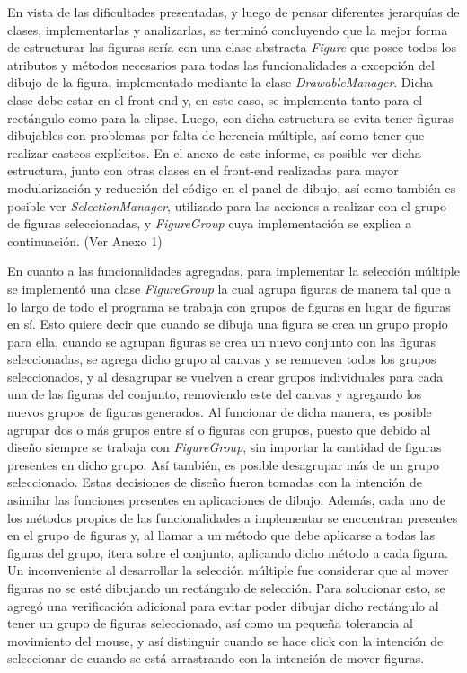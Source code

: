 \documentclass[12pt]{article}
\begin{document}
En vista de las dificultades presentadas, y luego de pensar diferentes jerarquías de clases, implementarlas y analizarlas, se terminó concluyendo que la mejor forma de estructurar las figuras sería con una clase abstracta \textit{Figure} que posee todos los atributos y métodos necesarios para todas las funcionalidades a excepción del dibujo de la figura, implementado mediante la clase \textit{DrawableManager}. Dicha clase debe estar en el front-end y, en este caso, se implementa tanto para el rectángulo como para la elipse. Luego, con dicha estructura se evita tener figuras dibujables con problemas por falta de herencia múltiple, así como tener que realizar casteos explícitos. En el anexo de este informe, es posible ver dicha estructura, junto con otras clases en el front-end realizadas para mayor modularización y reducción del código en el panel de dibujo, así como también es posible ver \textit{SelectionManager}, utilizado para las acciones a realizar con el grupo de figuras seleccionadas, y \textit{FigureGroup} cuya implementación se explica a continuación. (Ver Anexo 1)

En cuanto a las funcionalidades agregadas, para implementar la selección múltiple se implementó una clase \textit{FigureGroup} la cual agrupa figuras de manera tal que a lo largo de todo el programa se trabaja con grupos de figuras en lugar de figuras en sí. Esto quiere decir que cuando se dibuja una figura se crea un grupo propio para ella, cuando se agrupan figuras se crea un nuevo conjunto con las figuras seleccionadas, se agrega dicho grupo al canvas y se remueven todos los grupos seleccionados, y al desagrupar se vuelven a crear grupos individuales para cada una de las figuras del conjunto, removiendo este del canvas y agregando los nuevos grupos de figuras generados. Al funcionar de dicha manera, es posible agrupar dos o más grupos entre sí o figuras con grupos, puesto que debido al diseño siempre se trabaja con \textit{FigureGroup}, sin importar la cantidad de figuras presentes en dicho grupo. Así también, es posible desagrupar más de un grupo seleccionado. Estas decisiones de diseño fueron tomadas con la intención de asimilar las funciones presentes en aplicaciones de dibujo. Además, cada uno de los métodos propios de las funcionalidades a implementar se encuentran presentes en el grupo de figuras y, al llamar a un método que debe aplicarse a todas las figuras del grupo, itera sobre el conjunto, aplicando dicho método a cada figura. Un inconveniente al desarrollar la selección múltiple fue considerar que al mover figuras no se esté dibujando un rectángulo de selección. Para solucionar esto, se agregó una verificación adicional para evitar poder dibujar dicho rectángulo al tener un grupo de figuras seleccionado, así como un pequeña tolerancia al movimiento del mouse, y así distinguir cuando se hace click con la intención de seleccionar de cuando se está arrastrando con la intención de mover figuras.
\end{document}
